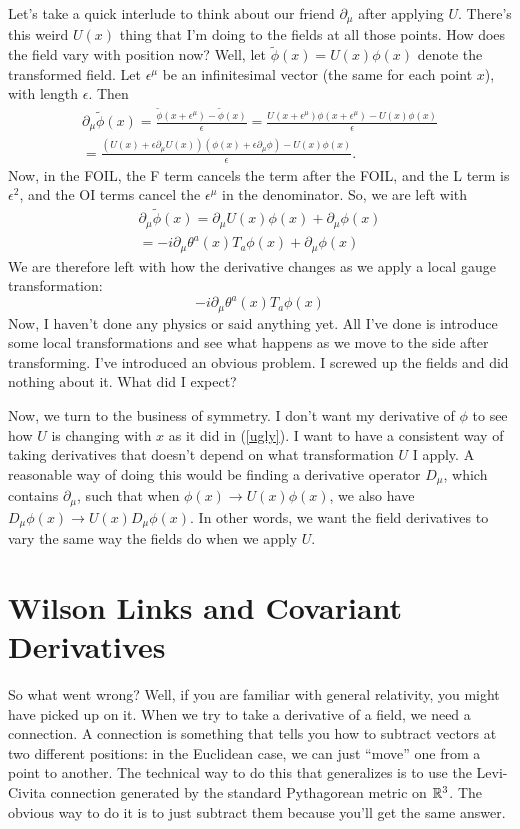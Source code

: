\documentclass[main.tex]{subfiles}
\begin{document}
Let's take a quick interlude to think about our friend $\partial_\mu$ after applying $U$. There's this weird $U(x)$ thing that I'm doing to the fields at all those points. How does the field vary with position now? Well, let $\tilde{\phi}(x) = U (x) \phi(x)$ denote the transformed field. Let $\epsilon^\mu$ be an infinitesimal vector (the same for each point $x$), with length $\epsilon$. Then
\begin{align*}
\partial_\mu \tilde{\phi} (x) =
\frac{\tilde{\phi} (x + \epsilon^\mu) - \tilde{\phi}(x)}{\epsilon} = 
\frac{U(x + \epsilon^\mu) \phi(x + \epsilon^\mu) - U(x) \phi(x)}{\epsilon} \\ =
\frac{\left( U (x) + \epsilon \partial_\mu U (x)\right) \left(\phi(x) + \epsilon \partial_\mu \phi \right) - U(x) \phi(x)}{\epsilon}.
\end{align*}
Now, in the FOIL, the F term cancels the term after the FOIL, and the L term is $\epsilon^2$, and the OI terms cancel the $\epsilon^\mu$ in the denominator. So, we are left with
\begin{align*}
\partial_\mu \tilde{\phi} (x) = \partial_\mu U (x) \phi(x) + \partial_\mu \phi (x) \\ =
-i \partial_\mu \theta^a (x) T_a \phi(x) + \partial_\mu \phi (x)
\end{align*}
We are therefore left with how the derivative changes as we apply a local gauge transformation:
\begin{equation} \label{ugly}
-i \partial_\mu \theta^a (x) T_a \phi(x) 
\end{equation}
Now, I haven't done any physics or said anything yet. All I've done is introduce some local transformations and see what happens as we move to the side after transforming. I've introduced an obvious problem. I screwed up the fields and did nothing about it. What did I expect?

Now, we turn to the business of symmetry. I don't want my derivative of $\phi$ to see how $U$ is changing with $x$ as it did in (\ref{ugly}). I want to have a consistent way of taking derivatives that doesn't depend on what transformation $U$ I apply. A reasonable way of doing this would be finding a derivative operator $D_\mu$, which contains $\partial_\mu$, such that when $\phi (x) \to U(x) \phi(x)$, we also have $D_\mu \phi(x) \to U(x) D_\mu \phi(x)$. In other words, we want the field derivatives to vary the same way the fields do when we apply $U$.

\section{Wilson Links and Covariant Derivatives}
So what went wrong? Well, if you are familiar with general relativity, you might have picked up on it. When we try to take a derivative of a field, we need a connection. A connection is something that tells you how to subtract vectors at two different positions: in the Euclidean case, we can just ``move'' one from a point to another. The technical way to do this that generalizes is to use the Levi-Civita connection generated by the standard Pythagorean metric on $\mathbb{R}^3$. The obvious way to do it is to just subtract them because you'll get the same answer. 
\end{document}

